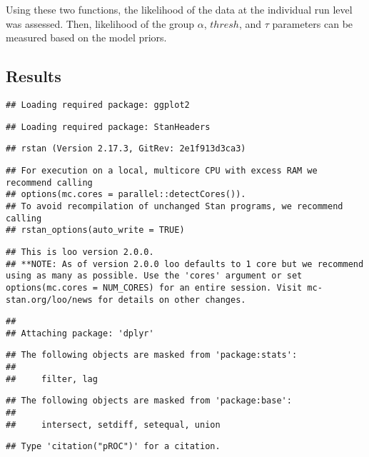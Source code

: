 \documentclass[]{article}
\begin{document}
Using these two functions, the likelihood of the data at the individual
run level was assessed. Then, likelihood of the group \(\alpha\),
\(thresh\), and \(\tau\) parameters can be measured based on the model
priors.

\subsection{Results}\label{results}

\begin{verbatim}
## Loading required package: ggplot2
\end{verbatim}

\begin{verbatim}
## Loading required package: StanHeaders
\end{verbatim}

\begin{verbatim}
## rstan (Version 2.17.3, GitRev: 2e1f913d3ca3)
\end{verbatim}

\begin{verbatim}
## For execution on a local, multicore CPU with excess RAM we recommend calling
## options(mc.cores = parallel::detectCores()).
## To avoid recompilation of unchanged Stan programs, we recommend calling
## rstan_options(auto_write = TRUE)
\end{verbatim}

\begin{verbatim}
## This is loo version 2.0.0.
## **NOTE: As of version 2.0.0 loo defaults to 1 core but we recommend using as many as possible. Use the 'cores' argument or set options(mc.cores = NUM_CORES) for an entire session. Visit mc-stan.org/loo/news for details on other changes.
\end{verbatim}

\begin{verbatim}
## 
## Attaching package: 'dplyr'
\end{verbatim}

\begin{verbatim}
## The following objects are masked from 'package:stats':
## 
##     filter, lag
\end{verbatim}

\begin{verbatim}
## The following objects are masked from 'package:base':
## 
##     intersect, setdiff, setequal, union
\end{verbatim}

\begin{verbatim}
## Type 'citation("pROC")' for a citation.
\end{verbatim}
\end{document}
